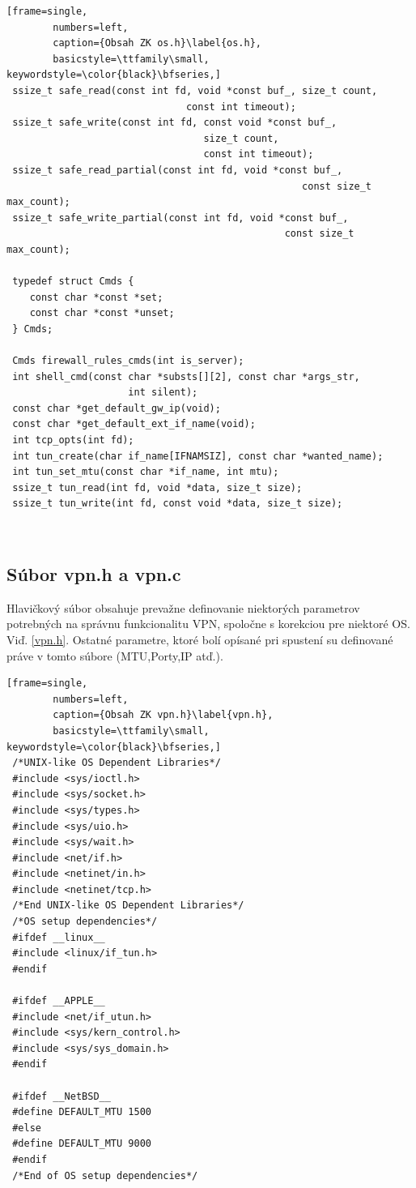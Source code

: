  \begin{minipage}{\linewidth} 	
	\begin{lstlisting}[frame=single,
		numbers=left,
		caption={Obsah ZK os.h}\label{os.h},
		basicstyle=\ttfamily\small, keywordstyle=\color{black}\bfseries,]
 ssize_t safe_read(const int fd, void *const buf_, size_t count, 
 						       const int timeout);
 ssize_t safe_write(const int fd, const void *const buf_, 
 							      size_t count,
 							      const int timeout);
 ssize_t safe_read_partial(const int fd, void *const buf_,
 							 					   const size_t max_count);
 ssize_t safe_write_partial(const int fd, void *const buf_, 
 							    		     	const size_t max_count);
 
 typedef struct Cmds {
 	const char *const *set;
 	const char *const *unset;
 } Cmds;
 
 Cmds firewall_rules_cmds(int is_server);
 int shell_cmd(const char *substs[][2], const char *args_str,
 			         int silent);
 const char *get_default_gw_ip(void);
 const char *get_default_ext_if_name(void);
 int tcp_opts(int fd);
 int tun_create(char if_name[IFNAMSIZ], const char *wanted_name);
 int tun_set_mtu(const char *if_name, int mtu);
 ssize_t tun_read(int fd, void *data, size_t size);
 ssize_t tun_write(int fd, const void *data, size_t size); 
\end{lstlisting}
\end{minipage}\\ 
 \subsection{Súbor vpn.h a vpn.c}
 Hlavičkový súbor obsahuje prevažne definovanie niektorých parametrov potrebných na správnu funkcionalitu VPN, spoločne s korekciou pre niektoré OS. Viď. \ref{vpn.h}. Ostatné parametre, ktoré bolí opísané pri spustení su definované práve v tomto súbore (MTU,Porty,IP atď.).
 
 \begin{minipage}{\linewidth} 	
 	\begin{lstlisting}[frame=single,
 		numbers=left,
 		caption={Obsah ZK vpn.h}\label{vpn.h},
 		basicstyle=\ttfamily\small, keywordstyle=\color{black}\bfseries,]
 /*UNIX-like OS Dependent Libraries*/
 #include <sys/ioctl.h>
 #include <sys/socket.h>
 #include <sys/types.h>
 #include <sys/uio.h>
 #include <sys/wait.h>
 #include <net/if.h>
 #include <netinet/in.h>
 #include <netinet/tcp.h>
 /*End UNIX-like OS Dependent Libraries*/
 /*OS setup dependencies*/
 #ifdef __linux__
 #include <linux/if_tun.h>
 #endif
 
 #ifdef __APPLE__
 #include <net/if_utun.h>
 #include <sys/kern_control.h>
 #include <sys/sys_domain.h>
 #endif
 
 #ifdef __NetBSD__
 #define DEFAULT_MTU 1500
 #else
 #define DEFAULT_MTU 9000
 #endif
 /*End of OS setup dependencies*/ 
 	\end{lstlisting}
\end{minipage}\\

